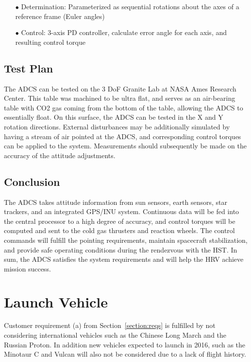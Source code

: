 \documentclass[paper=letter, fontsize=11pt]{scrartcl} %
\numberwithin{equation}{section} %
\numberwithin{figure}{section} %
\numberwithin{table}{section} %
\begin{document}
\begin{enumerate}
\item[$\bullet$] Determination: Parameterized as sequential rotations about the axes of a reference frame (Euler angles)
\item[$\bullet$] Control: 3-axis PD controller, calculate error angle for each axis, and resulting control torque
\end{enumerate}

\subsection{Test Plan}
The ADCS can be tested on the 3 DoF Granite Lab at NASA Ames Research Center. This table was machined to be ultra flat, and serves as an air-bearing table with CO2 gas coming from the bottom of the table, allowing the ADCS to essentially float. On this surface, the ADCS can be tested in the X and Y rotation directions. External disturbances may be additionally simulated by having a stream of air pointed at the ADCS, and corresponding control torques can be applied to the system. Measurements should subsequently be made on the accuracy of the attitude adjustments.

\subsection{Conclusion}
The ADCS takes attitude information from sun sensors, earth sensors, star trackers, and an integrated GPS/INU system. Continuous data will be fed into the central processor to a high degree of accuracy, and control torques will be computed and sent to the cold gas thrusters and reaction wheels. The control commands will fulfill the pointing requirements, maintain spacecraft stabilization, and provide safe operating conditions during the rendezvous with the HST. In sum, the ADCS satisfies the system requirements and will help the HRV achieve mission success.


\section{Launch Vehicle}

Customer requirement (a) from Section~\ref{section:reqs} is fulfilled by not considering international vehicles such as the Chinese Long March and the Russian Proton. In addition new vehicles expected to launch in 2016, such as the Minotaur C and Vulcan will also not be considered due to a lack of flight history.
\end{document}
